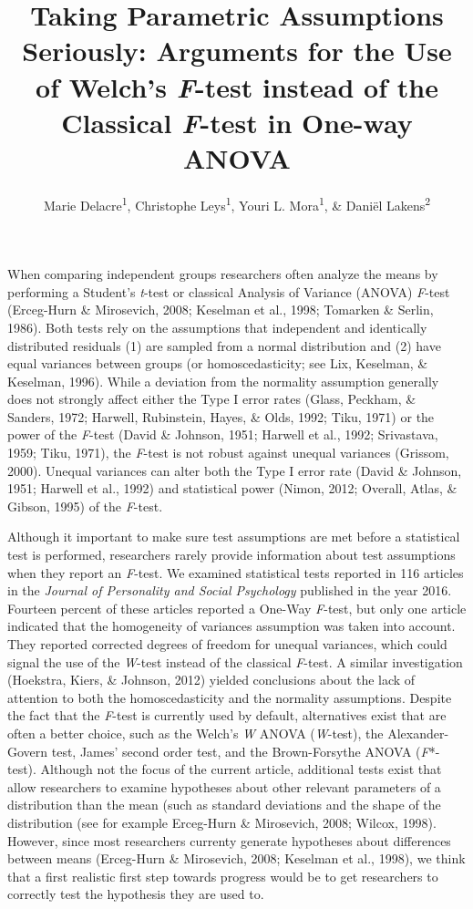 \documentclass[man,floatsintext]{apa6}
\title{Taking Parametric Assumptions Seriously: Arguments for the Use of Welch's \emph{F}-test instead of the Classical \emph{F}-test in One-way ANOVA}
\author{Marie Delacre\textsuperscript{1}, Christophe Leys\textsuperscript{1}, Youri L. Mora\textsuperscript{1}, \& Daniël Lakens\textsuperscript{2}}
\date{}
\affiliation{
\vspace{0.5cm}
\textsuperscript{1} Université Libre de Bruxelles, Service of Analysis of the Data (SAD), Bruxelles, Belgium\\\textsuperscript{2} Eindhoven University of Technology, Human Technology Interaction Group, Eindhoven, the Netherlands }
\begin{document}
\maketitle

When comparing independent groups researchers often analyze the means by performing a Student's \emph{t}-test or classical Analysis of Variance (ANOVA) \emph{F}-test (Erceg-Hurn \& Mirosevich, 2008; Keselman et al., 1998; Tomarken \& Serlin, 1986). Both tests rely on the assumptions that independent and identically distributed residuals (1) are sampled from a normal distribution and (2) have equal variances between groups (or homoscedasticity; see Lix, Keselman, \& Keselman, 1996). While a deviation from the normality assumption generally does not strongly affect either the Type I error rates (Glass, Peckham, \& Sanders, 1972; Harwell, Rubinstein, Hayes, \& Olds, 1992; Tiku, 1971) or the power of the \emph{F}-test (David \& Johnson, 1951; Harwell et al., 1992; Srivastava, 1959; Tiku, 1971), the \emph{F}-test is not robust against unequal variances (Grissom, 2000). Unequal variances can alter both the Type I error rate (David \& Johnson, 1951; Harwell et al., 1992) and statistical power (Nimon, 2012; Overall, Atlas, \& Gibson, 1995) of the \emph{F}-test.

Although it important to make sure test assumptions are met before a statistical test is performed, researchers rarely provide information about test assumptions when they report an \emph{F}-test. We examined statistical tests reported in 116 articles in the \emph{Journal of Personality and Social Psychology} published in the year 2016. Fourteen percent of these articles reported a One-Way \emph{F}-test, but only one article indicated that the homogeneity of variances assumption was taken into account. They reported corrected degrees of freedom for unequal variances, which could signal the use of the \emph{W}-test instead of the classical \emph{F}-test. A similar investigation (Hoekstra, Kiers, \& Johnson, 2012) yielded conclusions about the lack of attention to both the homoscedasticity and the normality assumptions. Despite the fact that the \emph{F}-test is currently used by default, alternatives exist that are often a better choice, such as the Welch's \emph{W} ANOVA (\emph{W}-test), the Alexander-Govern test, James' second order test, and the Brown-Forsythe ANOVA (\emph{F}*-test). Although not the focus of the current article, additional tests exist that allow researchers to examine hypotheses about other relevant parameters of a distribution than the mean (such as standard deviations and the shape of the distribution (see for example Erceg-Hurn \& Mirosevich, 2008; Wilcox, 1998). However, since most researchers currenty generate hypotheses about differences between means (Erceg-Hurn \& Mirosevich, 2008; Keselman et al., 1998), we think that a first realistic first step towards progress would be to get researchers to correctly test the hypothesis they are used to.
\end{document}
